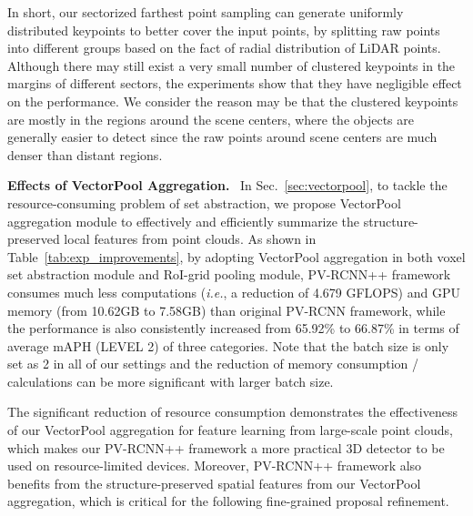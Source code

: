 \documentclass[natbib,twocolumn]{svjour3}          \smartqed  \usepackage{graphicx}
\begin{document}
In short, our sectorized farthest point sampling can generate uniformly distributed keypoints to better cover the input points,  by splitting raw points into different groups based on the fact of radial distribution of LiDAR points. 
Although there may still exist a very small number of clustered keypoints in the margins of different sectors, the experiments show that they have negligible effect on the performance. 
We consider the reason may be that the clustered keypoints are mostly in the regions around the scene centers, where the objects are generally easier to detect since the raw points around scene centers are much denser than distant regions.





\noindent
\textbf{Effects of VectorPool Aggregation.}~
In Sec.~\ref{sec:vectorpool}, to tackle the resource-consuming problem of set abstraction, we propose VectorPool aggregation module to effectively and efficiently summarize the structure-preserved local features from point clouds. 
As shown in Table~\ref{tab:exp_improvements}, by adopting VectorPool aggregation in both voxel set abstraction module and RoI-grid pooling module, PV-RCNN++ framework consumes much less computations (\emph{i.e.}, a reduction of 4.679 GFLOPS) and GPU memory (from 10.62GB to 7.58GB) than original PV-RCNN framework, while the performance is also consistently increased from 65.92\% to 66.87\% in terms of average mAPH (LEVEL 2) of three categories. Note that the batch size is only set as 2 in all of our settings and the reduction of memory consumption / calculations can be more significant with larger batch size. 

The significant reduction of resource consumption demonstrates the effectiveness of our VectorPool aggregation for feature learning from large-scale point clouds, which makes our PV-RCNN++ framework a more practical 3D detector to be used on resource-limited devices. Moreover, PV-RCNN++ framework also benefits from the structure-preserved spatial features from our VectorPool aggregation, which is critical for the following fine-grained proposal refinement. 
\end{document}
